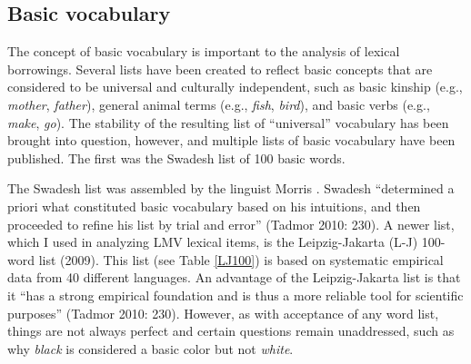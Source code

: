 \documentclass[output=paper]{LSP/langsci}
\begin{document}
\subsection{Basic vocabulary}

	The concept of basic vocabulary is important to the analysis of lexical borrowings. Several lists have been created to reflect basic concepts that are considered to be universal and culturally independent, such as basic kinship (e.g., \emph{mother}, \emph{father}), general animal terms (e.g., \emph{fish}, \emph{bird}), and basic verbs (e.g., \emph{make}, \emph{go}). The stability of the resulting list of “universal” vocabulary has been brought into question, however, and multiple lists of basic vocabulary have been published. The first was the Swadesh list of 100 basic words.

	The Swadesh list was assembled by the linguist Morris \citet{Swadesh1971}. Swadesh “determined a priori what constituted basic vocabulary based on his intuitions, and then proceeded to refine his list by trial and error” (Tadmor 2010: 230). A newer list, which I used in analyzing LMV lexical items, is the Leipzig-Jakarta (L-J) 100-word list (2009). This list (see Table \ref{LJ100}) is based on systematic empirical data from 40 different languages. An advantage of the Leipzig-Jakarta list is that it ``has a strong empirical foundation and is thus a more reliable tool for scientific purposes” (Tadmor 2010: 230). However, as with acceptance of any word list, things are not always perfect and certain questions remain unaddressed, such as why \emph{black} is considered a basic color but not \emph{white}.
\end{document}

